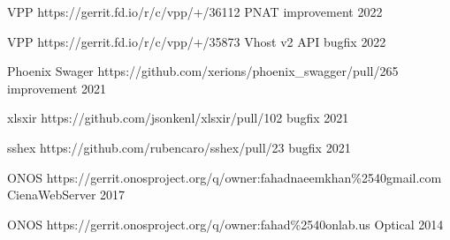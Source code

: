 

\begin{cvhonors}

  \cvhonor
    {VPP} %
    {https://gerrit.fd.io/r/c/vpp/+/36112}
    {PNAT improvement} %
    {2022} %

  \cvhonor
    {VPP} %
    {https://gerrit.fd.io/r/c/vpp/+/35873}
    {Vhost v2 API bugfix} %
    {2022} %

  \cvhonor
    {Phoenix Swager} %
    {https://github.com/xerions/phoenix\_swagger/pull/265}
    {improvement} %
    {2021} %

  \cvhonor
    {xlsxir} %
    {https://github.com/jsonkenl/xlsxir/pull/102}
    {bugfix} %
    {2021} %

  \cvhonor
    {sshex} %
    {https://github.com/rubencaro/sshex/pull/23}
    {bugfix} %
    {2021} %


  \cvhonor
    {ONOS} %
    {https://gerrit.onosproject.org/q/owner:fahadnaeemkhan\%2540gmail.com}
    {CienaWebServer} %
    {2017} %

  \cvhonor
    {ONOS} %
    {https://gerrit.onosproject.org/q/owner:fahad\%2540onlab.us}
    {Optical} %
    {2014} %

\end{cvhonors}

